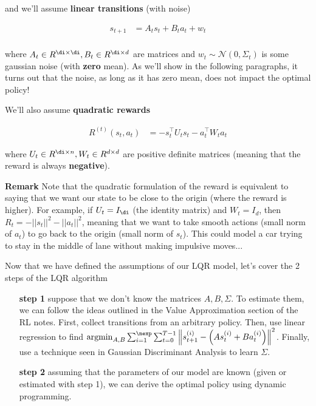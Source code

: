 \documentclass{article}
\begin{document}
and we'll assume \textbf{linear transitions} (with noise)


\begin{align*}
	 s_{t+1} &= A_t s_t + B_t a_t + w_t\\
\end{align*}

where $ A_t \in R^{\di\times \di}, B_t \in R^{\di \times d} $ are matrices and $ w_t \sim \mathcal{N}(0, \Sigma_t)  $ is some gaussian noise (with \textbf{zero} mean). As we'll show in the following paragraphs, it turns out that the noise, as long as it has zero mean, does not impact the optimal policy!

We'll also assume \textbf{quadratic rewards}

\begin{align*}
		R^{(t)}(s_t, a_t)& = - s_t^\top U_t s_t - a_t^\top W_t a_t
\end{align*}

where $ U_t \in R^{\di \times n }, W_t \in R^{d \times d}$  are positive definite matrices (meaning that the reward is always \textbf{negative}). 

\vspace{1cm}

\textbf{Remark} Note that the quadratic formulation of the reward is equivalent to saying that we want our state to be close to the origin (where the reward is higher). For example, if $ U_t = I_{\di} $ (the identity matrix) and $ W_t = I_d $, then $ R_t = - || s_t ||^2 - ||a_t ||^2 $, meaning that we want to take smooth actions (small norm of $ a_t $) to go back to the origin  (small norm of $ s_t $). This could model a car trying to stay in the middle of lane without making impulsive moves...

\vspace{0.5cm}

Now that we have defined the assumptions of our LQR model, let's cover the 2 steps of the LQR algorithm

\begin{enumerate}
	\item[\textbf{step 1}] suppose that we don't know the matrices $ A, B, \Sigma $. To estimate them, we can follow the ideas outlined in the Value Approximation section of the RL notes. First, collect transitions from an arbitrary policy. Then, use linear regression to find $ \operatorname{argmin}_{A,B} \sum_{i=1}^\nexp \sum_{t=0}^{T-1} \left\| s^{(i)}_{t+1} - \left(A s^{(i)}_t + B a^{(i)}_t\right) \right\|^2$. Finally, use a technique seen in Gaussian Discriminant Analysis to learn $ \Sigma $.
	\item[\textbf{step 2}] assuming that the parameters of our model are known (given or estimated with step 1), we can derive the optimal policy using dynamic programming.
\end{enumerate}
\end{document}
